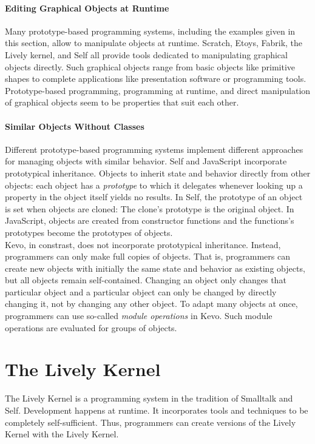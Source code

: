 \paragraph{Editing Graphical Objects at Runtime}
Many prototype-based programming systems, including the examples given in this section, allow to manipulate objects at runtime.
Scratch, Etoys, Fabrik, the Lively kernel, and Self all provide tools dedicated to manipulating graphical objects directly.
Such graphical objects range from basic objects like primitive shapes to complete applications like presentation software or programming tools.
Prototype-based programming, programming at runtime, and direct manipulation of graphical objects seem to be properties that suit each other.

\paragraph{Similar Objects Without Classes}
Different prototype-based programming systems implement different approaches for managing objects with similar behavior.
Self and JavaScript incorporate prototypical inheritance.
Objects to inherit state and behavior directly from other objects: each object has a \emph{prototype} to which it delegates whenever looking up a property in the object itself yields no results.
In Self, the prototype of an object is set when objects are cloned: The clone's prototype is the original object.
In JavaScript, objects are created from constructor functions and the functions's prototypes become the prototypes of objects.\\
Kevo, in constrast, does not incorporate prototypical inheritance.
Instead, programmers can only make full copies of objects.
That is, programmers can create new objects with initially the same state and behavior as existing objects, but all objects remain self-contained.
Changing an object only changes that particular object and a particular object can only be changed by directly changing it, not by changing any other object.
To adapt many objects at once, programmers can use so-called \emph{module operations} in Kevo.
Such module operations are evaluated for groups of objects.


\section{The Lively Kernel}

The Lively Kernel is a programming system in the tradition of Smalltalk and Self.
Development happens at runtime.
It incorporates tools and techniques to be completely self-sufficient.
Thus, programmers can create versions of the Lively Kernel with the Lively Kernel.

